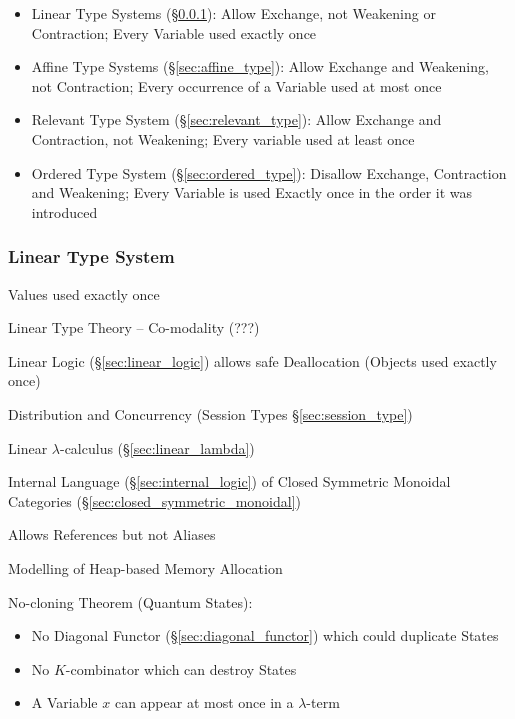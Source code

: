 \begin{itemize}
  \item Linear Type Systems (\S\ref{sec:linear_type}): Allow Exchange,
    not Weakening or Contraction; Every Variable used exactly once
  \item Affine Type Systems (\S\ref{sec:affine_type}): Allow Exchange
    and Weakening, not Contraction; Every occurrence of a Variable
    used at most once
  \item Relevant Type System (\S\ref{sec:relevant_type}): Allow
    Exchange and Contraction, not Weakening; Every variable used at
    least once
  \item Ordered Type System (\S\ref{sec:ordered_type}): Disallow
    Exchange, Contraction and Weakening; Every Variable is used
    Exactly once in the order it was introduced
\end{itemize}



\subsubsection{Linear Type System}\label{sec:linear_type}

Values used exactly once

Linear Type Theory -- Co-modality (???) %

Linear Logic (\S\ref{sec:linear_logic}) allows safe Deallocation
(Objects used exactly once)

Distribution and Concurrency (Session Types \S\ref{sec:session_type})

Linear $\lambda$-calculus (\S\ref{sec:linear_lambda})

Internal Language (\S\ref{sec:internal_logic}) of Closed Symmetric
Monoidal Categories (\S\ref{sec:closed_symmetric_monoidal})

Allows References but not Aliases

Modelling of Heap-based Memory Allocation

No-cloning Theorem (Quantum States):
\begin{itemize}
  \item No Diagonal Functor (\S\ref{sec:diagonal_functor})
    which could duplicate States
  \item No $K$-combinator which can destroy States
  \item A Variable $x$ can appear at most once in a $\lambda$-term
\end{itemize}



